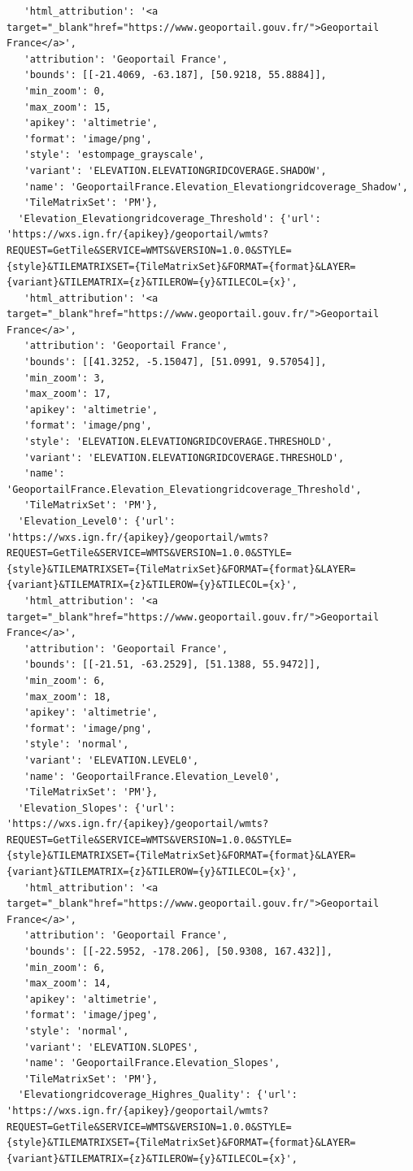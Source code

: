\documentclass[
  letterpaper,
  DIV=11,
  numbers=noendperiod]{scrreprt}
\begin{document}
\begin{verbatim}
   'html_attribution': '<a target="_blank"href="https://www.geoportail.gouv.fr/">Geoportail France</a>',
   'attribution': 'Geoportail France',
   'bounds': [[-21.4069, -63.187], [50.9218, 55.8884]],
   'min_zoom': 0,
   'max_zoom': 15,
   'apikey': 'altimetrie',
   'format': 'image/png',
   'style': 'estompage_grayscale',
   'variant': 'ELEVATION.ELEVATIONGRIDCOVERAGE.SHADOW',
   'name': 'GeoportailFrance.Elevation_Elevationgridcoverage_Shadow',
   'TileMatrixSet': 'PM'},
  'Elevation_Elevationgridcoverage_Threshold': {'url': 'https://wxs.ign.fr/{apikey}/geoportail/wmts?REQUEST=GetTile&SERVICE=WMTS&VERSION=1.0.0&STYLE={style}&TILEMATRIXSET={TileMatrixSet}&FORMAT={format}&LAYER={variant}&TILEMATRIX={z}&TILEROW={y}&TILECOL={x}',
   'html_attribution': '<a target="_blank"href="https://www.geoportail.gouv.fr/">Geoportail France</a>',
   'attribution': 'Geoportail France',
   'bounds': [[41.3252, -5.15047], [51.0991, 9.57054]],
   'min_zoom': 3,
   'max_zoom': 17,
   'apikey': 'altimetrie',
   'format': 'image/png',
   'style': 'ELEVATION.ELEVATIONGRIDCOVERAGE.THRESHOLD',
   'variant': 'ELEVATION.ELEVATIONGRIDCOVERAGE.THRESHOLD',
   'name': 'GeoportailFrance.Elevation_Elevationgridcoverage_Threshold',
   'TileMatrixSet': 'PM'},
  'Elevation_Level0': {'url': 'https://wxs.ign.fr/{apikey}/geoportail/wmts?REQUEST=GetTile&SERVICE=WMTS&VERSION=1.0.0&STYLE={style}&TILEMATRIXSET={TileMatrixSet}&FORMAT={format}&LAYER={variant}&TILEMATRIX={z}&TILEROW={y}&TILECOL={x}',
   'html_attribution': '<a target="_blank"href="https://www.geoportail.gouv.fr/">Geoportail France</a>',
   'attribution': 'Geoportail France',
   'bounds': [[-21.51, -63.2529], [51.1388, 55.9472]],
   'min_zoom': 6,
   'max_zoom': 18,
   'apikey': 'altimetrie',
   'format': 'image/png',
   'style': 'normal',
   'variant': 'ELEVATION.LEVEL0',
   'name': 'GeoportailFrance.Elevation_Level0',
   'TileMatrixSet': 'PM'},
  'Elevation_Slopes': {'url': 'https://wxs.ign.fr/{apikey}/geoportail/wmts?REQUEST=GetTile&SERVICE=WMTS&VERSION=1.0.0&STYLE={style}&TILEMATRIXSET={TileMatrixSet}&FORMAT={format}&LAYER={variant}&TILEMATRIX={z}&TILEROW={y}&TILECOL={x}',
   'html_attribution': '<a target="_blank"href="https://www.geoportail.gouv.fr/">Geoportail France</a>',
   'attribution': 'Geoportail France',
   'bounds': [[-22.5952, -178.206], [50.9308, 167.432]],
   'min_zoom': 6,
   'max_zoom': 14,
   'apikey': 'altimetrie',
   'format': 'image/jpeg',
   'style': 'normal',
   'variant': 'ELEVATION.SLOPES',
   'name': 'GeoportailFrance.Elevation_Slopes',
   'TileMatrixSet': 'PM'},
  'Elevationgridcoverage_Highres_Quality': {'url': 'https://wxs.ign.fr/{apikey}/geoportail/wmts?REQUEST=GetTile&SERVICE=WMTS&VERSION=1.0.0&STYLE={style}&TILEMATRIXSET={TileMatrixSet}&FORMAT={format}&LAYER={variant}&TILEMATRIX={z}&TILEROW={y}&TILECOL={x}',

\end{verbatim}
\end{document}
